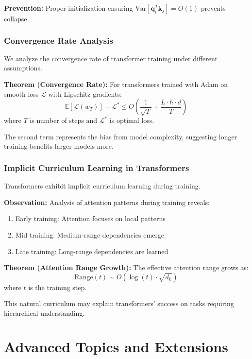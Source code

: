 \documentclass[11pt]{article}
\begin{document}
\textbf{Prevention:} Proper initialization ensuring $\text{Var}[\mathbf{q}_i^T\mathbf{k}_j] = O(1)$ prevents collapse.

\subsubsection{Convergence Rate Analysis}

We analyze the convergence rate of transformer training under different assumptions.

\textbf{Theorem (Convergence Rate):} For transformers trained with Adam on smooth loss $\mathcal{L}$ with Lipschitz gradients:
\begin{equation}
\mathbb{E}[\mathcal{L}(w_T)] - \mathcal{L}^* \leq O\left(\frac{1}{\sqrt{T}} + \frac{L \cdot h \cdot d}{T}\right)
\end{equation}
where $T$ is number of steps and $\mathcal{L}^*$ is optimal loss.

The second term represents the bias from model complexity, suggesting longer training benefits larger models more.

\subsubsection{Implicit Curriculum Learning in Transformers}

Transformers exhibit implicit curriculum learning during training.

\textbf{Observation:} Analysis of attention patterns during training reveals:
\begin{enumerate}
    \item Early training: Attention focuses on local patterns
    \item Mid training: Medium-range dependencies emerge
    \item Late training: Long-range dependencies are learned
\end{enumerate}

\textbf{Theorem (Attention Range Growth):} The effective attention range grows as:
\begin{equation}
\text{Range}(t) \sim O(\log(t) \cdot \sqrt{d_k})
\end{equation}
where $t$ is the training step.

This natural curriculum may explain transformers' success on tasks requiring hierarchical understanding.

\section{Advanced Topics and Extensions}
\end{document}
